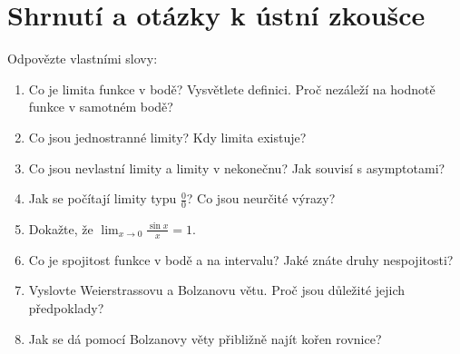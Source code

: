 \section{Shrnutí a otázky k ústní zkoušce}

\begin{problem}
  Odpovězte vlastními slovy:
  \begin{enumerate}
    \item Co je limita funkce v bodě? Vysvětlete definici. Proč nezáleží na hodnotě funkce v samotném bodě?
    \item Co jsou jednostranné limity? Kdy limita existuje?
    \item Co jsou nevlastní limity a limity v nekonečnu? Jak souvisí s asymptotami?
    \item Jak se počítají limity typu $\frac{0}{0}$? Co jsou neurčité výrazy?
    \item Dokažte, že $\lim_{x\to 0}\frac{\sin x}{x} = 1$.
    \item Co je spojitost funkce v bodě a na intervalu? Jaké znáte druhy nespojitosti?
    \item Vyslovte Weierstrassovu a Bolzanovu větu. Proč jsou důležité jejich předpoklady?
    \item Jak se dá pomocí Bolzanovy věty přibližně najít kořen rovnice?
  \end{enumerate}
\end{problem}
